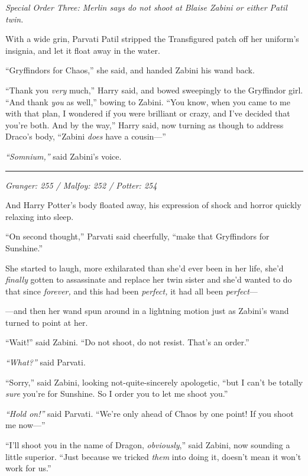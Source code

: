 \emph{Special Order Three: Merlin says do not shoot at Blaise Zabini or
either Patil twin.}

With a wide grin, Parvati Patil stripped the Transfigured patch off her
uniform's insignia, and let it float away in the water.

``Gryffindors for Chaos,'' she said, and handed Zabini his wand back.

``Thank you \emph{very} much,'' Harry said, and bowed sweepingly to the
Gryffindor girl. ``And thank \emph{you} as well,'' bowing to Zabini.
``You know, when you came to me with that plan, I wondered if you were
brilliant or crazy, and I've decided that you're both. And by the way,''
Harry said, now turning as though to address Draco's body, ``Zabini
\emph{does} have a cousin---''

\emph{``Somnium,''} said Zabini's voice.

\begin{center}\rule{3in}{0.4pt}\end{center}

\emph{Granger: 255 / Malfoy: 252 / Potter: 254}

And Harry Potter's body floated away, his expression of shock and horror
quickly relaxing into sleep.

``On second thought,'' Parvati said cheerfully, ``make that Gryffindors
for Sunshine.''

She started to laugh, more exhilarated than she'd ever been in her life,
she'd \emph{finally} gotten to assassinate and replace her twin sister
and she'd wanted to do that since \emph{forever,} and this had been
\emph{perfect,} it had all been \emph{perfect}---

---and then her wand spun around in a lightning motion just as Zabini's
wand turned to point at her.

``Wait!'' said Zabini. ``Do not shoot, do not resist. That's an order.''

\emph{``What?''} said Parvati.

``Sorry,'' said Zabini, looking not-quite-sincerely apologetic, ``but I
can't be totally \emph{sure} you're for Sunshine. So I order you to let
me shoot you.''

\emph{``Hold on!''} said Parvati. ``We're only ahead of Chaos by one
point! If you shoot me now---''

``I'll shoot you in the name of Dragon, \emph{obviously},'' said Zabini,
now sounding a little superior. ``Just because we tricked \emph{them}
into doing it, doesn't mean it won't work for us.''

